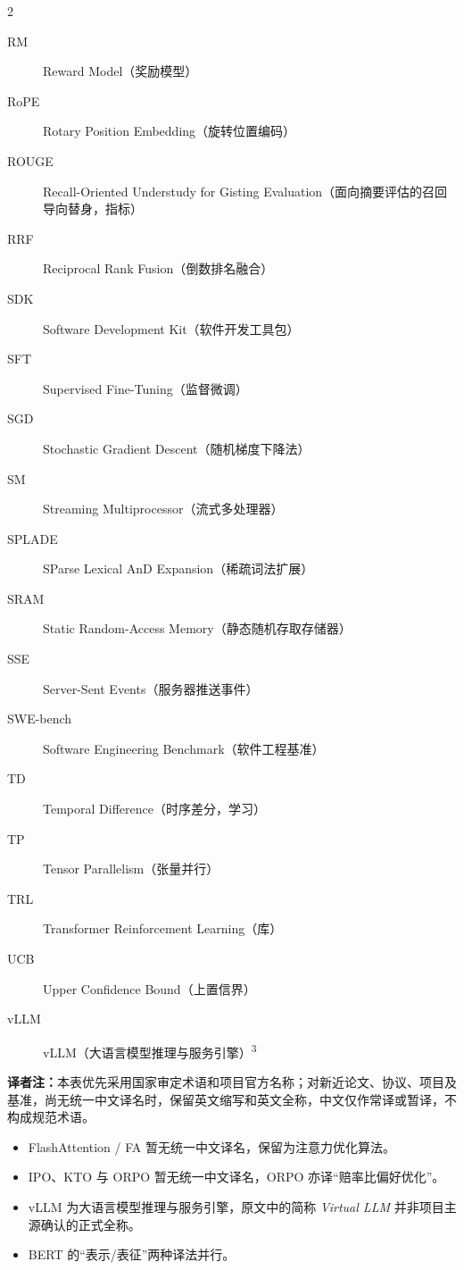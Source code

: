 \documentclass[11pt,a4paper,openany]{book}
\newcommand{\chapterlabel}{第~\thechapter~章}
\begin{document}
\begin{multicols}{2}
\begin{description}
\item[RM] Reward Model（奖励模型）
\item[RoPE] Rotary Position Embedding（旋转位置编码）
\item[ROUGE] Recall-Oriented Understudy for Gisting Evaluation（面向摘要评估的召回导向替身，指标）
\item[RRF] Reciprocal Rank Fusion（倒数排名融合）
\item[SDK] Software Development Kit（软件开发工具包）
\item[SFT] Supervised Fine-Tuning（监督微调）
\item[SGD] Stochastic Gradient Descent（随机梯度下降法）
\item[SM] Streaming Multiprocessor（流式多处理器）
\item[SPLADE] SParse Lexical AnD Expansion（稀疏词法扩展）
\item[SRAM] Static Random-Access Memory（静态随机存取存储器）
\item[SSE] Server-Sent Events（服务器推送事件）
\item[SWE-bench] Software Engineering Benchmark（软件工程基准）
\item[TD] Temporal Difference（时序差分，学习）
\item[TP] Tensor Parallelism（张量并行）
\item[TRL] Transformer Reinforcement Learning（库）
\item[UCB] Upper Confidence Bound（上置信界）
\item[vLLM] vLLM（大语言模型推理与服务引擎）\textsuperscript{3}

\end{description}
\end{multicols}
\smallskip
{\footnotesize\noindent\textbf{译者注：}本表优先采用国家审定术语和项目官方名称；对新近论文、协议、项目及基准，尚无统一中文译名时，保留英文缩写和英文全称，中文仅作常译或暂译，不构成规范术语。\par}
{\footnotesize
\begin{itemize}
\setlength{\itemsep}{0pt}
\setlength{\parskip}{0pt}
\item[\textsuperscript{1}] FlashAttention / FA 暂无统一中文译名，保留为注意力优化算法。
\item[\textsuperscript{2}] IPO、KTO 与 ORPO 暂无统一中文译名，ORPO 亦译“赔率比偏好优化”。
\item[\textsuperscript{3}] vLLM 为大语言模型推理与服务引擎，原文中的简称 \emph{Virtual LLM} 并非项目主源确认的正式全称。
\item[\textsuperscript{4}] BERT 的“表示/表征”两种译法并行。
\end{itemize}}











\appendix
\renewcommand{\chapterlabel}{附录~\thechapter}


\end{document}
